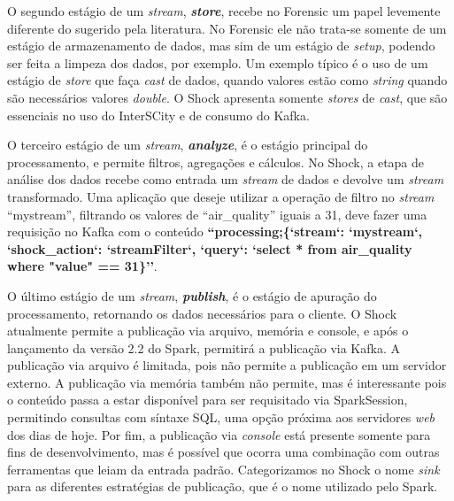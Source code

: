 O segundo estágio de um \textit{stream}, \textit{\textbf{store}}, recebe no
Forensic um papel levemente diferente do sugerido pela literatura. No Forensic
ele não trata-se somente de um estágio de armazenamento de dados, mas sim de um
estágio de \textit{setup}, podendo ser feita a limpeza dos dados, por exemplo. Um
exemplo típico é o uso de um estágio de \textit{store} que faça \textit{cast}
de dados, quando valores estão como \textit{string} quando são necessários valores
\textit{double}. O Shock apresenta somente \textit{stores} de \textit{cast},
que são essenciais no uso do InterSCity e de consumo do Kafka.



O terceiro estágio de um \textit{stream}, \textit{\textbf{analyze}}, é o
estágio principal do processamento, e permite filtros, agregações e cálculos.
No Shock, a etapa de análise dos dados recebe como entrada um \textit{stream}
de dados e devolve um \textit{stream} transformado. Uma aplicação que deseje
utilizar a operação de filtro no \textit{stream} ``mystream'', filtrando os
valores de ``air\_quality'' iguais a 31, deve fazer uma requisição no Kafka com o conteúdo
\textbf{``processing;\{`stream`: `mystream`,
`shock\_action`: `streamFilter`, `query`: `select * from air\_quality where
"value" == 31\}''}.



O último estágio de um \textit{stream}, \textit{\textbf{publish}}, é o estágio
de apuração do processamento, retornando os dados necessários para o cliente.
O Shock atualmente permite a publicação via arquivo, memória e console, e após o
lançamento da versão 2.2 do Spark, permitirá a publicação via Kafka. A
publicação via arquivo é limitada, pois não permite a publicação em um servidor
externo. A publicação via memória também não permite, mas é interessante pois
o conteúdo passa a estar disponível para ser requisitado via SparkSession,
permitindo consultas com síntaxe SQL, uma opção próxima aos servidores
\textit{web} dos dias de hoje. Por fim, a publicação via \textit{console} está
presente somente para fins de desenvolvimento, mas é possível que ocorra uma
combinação com outras ferramentas que leiam da entrada padrão. Categorizamos
no Shock o nome \textit{sink} para as diferentes estratégias de publicação,
que é o nome utilizado pelo Spark.

